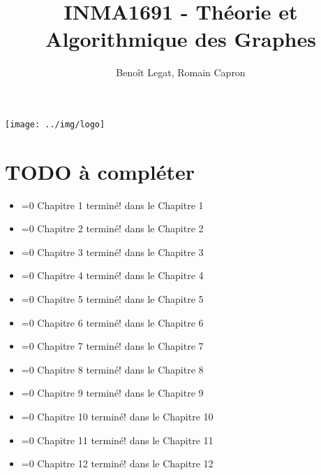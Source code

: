 

\title{INMA1691 - Théorie et Algorithmique des Graphes}
\author{Beno\^it Legat, Romain Capron}



\maketitle
\begin{center}
  \texttt{[image: ../img/logo]}
\end{center}
\newpage
\clearpage

\tableofcontents
\newpage


\newcommand{\addTODO}
{
  \textcolor{red}{TODO}\stepcounter{todo_\thesection}
}

\newcommand{\Chapitredone}[2]
{
  \ifnum#1=0
    Chapitre #2 terminé!
  \else
    #1 dans le Chapitre #2
  \fi
}














\clearpage
\section{TODO à compléter \textcolor{red}{\danger}}
\begin{itemize}
  \item \Chapitredone{}{1}
  \item \Chapitredone{}{2}
  \item \Chapitredone{}{3}
  \item \Chapitredone{}{4}
  \item \Chapitredone{}{5}
  \item \Chapitredone{}{6}
  \item \Chapitredone{}{7}
  \item \Chapitredone{}{8}
  \item \Chapitredone{}{9}
  \item \Chapitredone{}{10}
  \item \Chapitredone{}{11}
  \item \Chapitredone{}{12}\\
\end{itemize}

